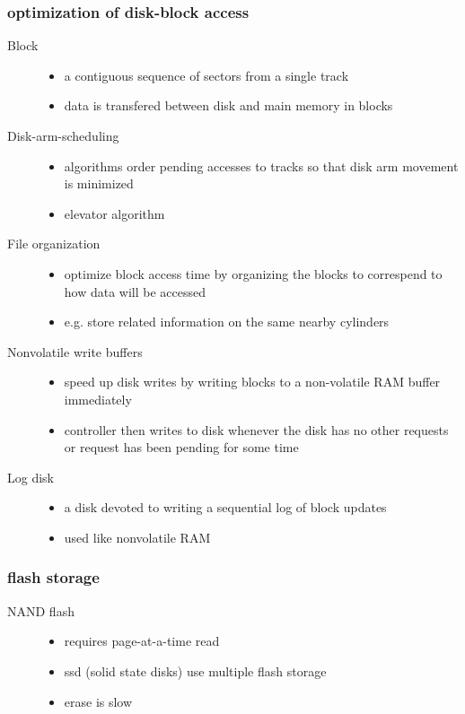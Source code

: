 \documentclass[11pt]{article}
\begin{document}
\subsubsection{optimization of disk-block access}
\label{sec-14-2-3}
\begin{description}
\item[{Block}] \begin{itemize}
\item a contiguous sequence of sectors from a single track
\item data is transfered between disk and main memory in blocks
\end{itemize}
\item[{Disk-arm-scheduling}] \begin{itemize}
\item algorithms order pending accesses to tracks so that disk arm movement
is minimized
\item elevator algorithm
\end{itemize}
\item[{File organization}] \begin{itemize}
\item optimize block access time by organizing the blocks to correspend to
how data will be accessed
\item e.g. store related information on the same nearby cylinders
\end{itemize}
\item[{Nonvolatile write buffers}] \begin{itemize}
\item speed up disk writes by writing blocks to a non-volatile RAM buffer
immediately
\item controller then writes to disk whenever the disk has no other requests
or request has been pending for some time
\end{itemize}
\item[{Log disk}] \begin{itemize}
\item a disk devoted to writing a sequential log of block updates
\item used like nonvolatile RAM
\end{itemize}
\end{description}
\subsubsection{flash storage}
\label{sec-14-2-4}
\begin{description}
\item[{NAND flash}] \begin{itemize}
\item requires page-at-a-time read
\item ssd (solid state disks) use multiple flash storage
\item erase is slow
\end{itemize}
\end{description}
\end{document}

